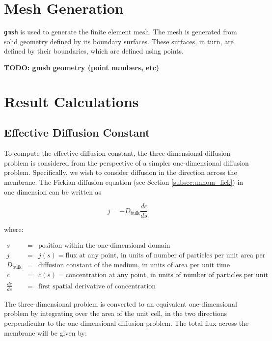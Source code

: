 \documentclass{article}
\begin{document}
\section{Mesh Generation}\label{sec:meshgen}

\texttt{gmsh} is used to generate the finite element mesh.
The mesh is generated from solid geometry defined by its boundary surfaces.
These surfaces, in turn, are defined by their boundaries,
which are defined using points.

\textbf{TODO: gmsh geometry (point numbers, etc)}

\section{Result Calculations}

\subsection{Effective Diffusion Constant}\label{subsec:D_eff}

To compute the effective diffusion constant,
the three-dimensional diffusion problem is considered from the perspective of a simpler one-dimensional diffusion problem.
Specifically, we wish to consider diffusion in the direction across the membrane.
The Fickian diffusion equation (see Section \ref{subsec:unhom_fick}) in one dimension can be written as

$$j = - D_{\text{bulk}} \frac{dc}{ds}$$

where:

$\begin{array}{rcl}
s & = & \text{position within the one-dimensional domain} \\
j & = & j(s) = \text{flux at any point, in units of number of particles per unit area per unit time} \\
D_{\text{bulk}} & = & \text{diffusion constant of the medium, in units of area per unit time} \\
c & = & c(s) = \text{concentration at any point, in units of number of particles per unit volume} \\
\frac{dc}{ds} & = & \text{first spatial derivative of concentration}
\end{array}$

The three-dimensional problem is converted to an equivalent one-dimensional problem
by integrating over the area of the unit cell, in the two directions perpendicular to
the one-dimensional diffusion problem.
The total flux across the membrane will be given by:
\end{document}
